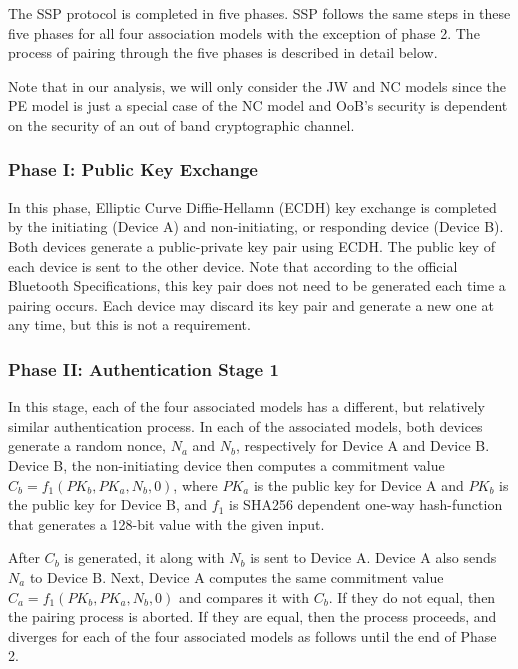 \documentclass{acm_proc_article-sp}
\begin{document}
The SSP protocol is completed in five phases. SSP follows the same steps in these five phases for all four association models with the exception of phase 2. The process of pairing through the five phases is described in detail below.

Note that in our analysis, we will only consider the JW and NC models since the PE model is just a special case of the NC model and OoB's security is dependent on the security of an out of band cryptographic channel.

\subsubsection{Phase I: Public Key Exchange}
In this phase, Elliptic Curve Diffie-Hellamn (ECDH) key exchange \cite{mingard:1} is completed by the initiating (Device A) and non-initiating, or responding device (Device B). Both devices generate a public-private key pair using ECDH. The public key of each device is sent to the other device. Note that according to the official Bluetooth Specifications, this key pair does not need to be generated each time a pairing occurs. Each device may discard its key pair and generate a new one at any time, but this is not a requirement.

\subsubsection{Phase II: Authentication Stage 1}
In this stage, each of the four associated models has a different, but relatively similar authentication process. In each of the associated models, both devices generate a random nonce, $N_a$ and $N_b$, respectively for Device A and Device B. Device B, the non-initiating device then computes a commitment value $C_b = f_1(PK_b, PK_a, N_b, 0)$, where $PK_a$ is the public key for Device A and $PK_b$ is the public key for Device B, and $f_1$ is SHA256 dependent one-way hash-function that generates a 128-bit value with the given input.

After $C_b$ is generated, it along with $N_b$ is sent to Device A. Device A also sends $N_a$ to Device B. Next, Device A computes the same commitment value $C_a = f_1(PK_b, PK_a, N_b, 0)$ and compares it with $C_b$. If they do not equal, then the pairing process is aborted. If they are equal, then the process proceeds, and diverges for each of the four associated models as follows until the end of Phase 2.
\end{document}
